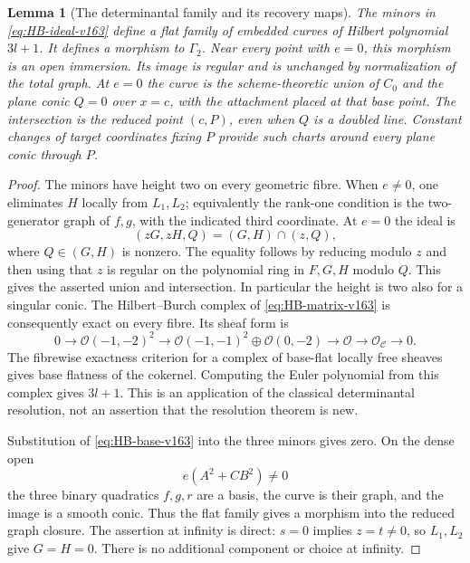\documentclass[11pt,reqno]{amsart}
\numberwithin{equation}{section}
\newtheorem{lemma}[theorem]{Lemma}
\theoremstyle{definition}\newtheorem{definition}[theorem]{Definition}
\theoremstyle{remark}\newtheorem{remark}[theorem]{Remark}
\newcommand{\OO}{\mathcal O}\newcommand{\II}{\mathcal I}
\begin{document}
\begin{lemma}[The determinantal family and its recovery maps]
\label{lem:HB-family-v163}
The minors in \eqref{eq:HB-ideal-v163} define a flat family of embedded
curves of Hilbert polynomial $3l+1$. It defines a morphism to $\Gamma_2$.
Near every point with $e=0$, this morphism is an open immersion. Its
image is regular and is unchanged by normalization of the total graph.
At $e=0$ the curve is the scheme-theoretic union of $C_0$ and the plane
conic $Q=0$ over $x=c$, with the attachment placed at that base
point. The intersection is the reduced point $(c,P)$, even when $Q$
is a doubled line. Constant changes of target coordinates fixing $P$
provide such charts around every plane conic through $P$.
\end{lemma}
\begin{proof}
The minors have height two on every geometric fibre. When $e\ne0$,
one eliminates $H$ locally from $L_1,L_2$; equivalently the rank-one
condition is the two-generator graph of $f,g$, with the indicated third
coordinate. At $e=0$ the ideal is
\[
 (zG,zH,Q)=(G,H)\cap(z,Q),
\]
where $Q\in(G,H)$ is nonzero. The equality follows by reducing modulo
$z$ and then using that $z$ is regular on the polynomial ring in
$F,G,H$ modulo $Q$. This gives the asserted union and intersection.
In particular the height is two also for a singular conic. The
Hilbert--Burch complex of \eqref{eq:HB-matrix-v163} is consequently
exact on every fibre. Its sheaf form is
\begin{equation}\label{eq:HB-resolution-v163}
 0\longrightarrow\OO(-1,-2)^2\longrightarrow
 \OO(-1,-1)^2\oplus\OO(0,-2)\longrightarrow
 \OO\longrightarrow\OO_{\mathcal C}\longrightarrow0.
\end{equation}
The fibrewise exactness criterion for a complex of base-flat locally
free sheaves gives base flatness of the cokernel. Computing the Euler
polynomial from this complex gives $3l+1$. This is an application of
the classical determinantal resolution, not an assertion that the
resolution theorem is new.

Substitution of \eqref{eq:HB-base-v163} into the three minors gives
zero. On the dense open
\[
             e(A^2+CB^2)\ne0
\]
the three binary quadratics $f,g,r$ are a basis, the curve is their
graph, and the image is a smooth conic. Thus the flat family gives a
morphism into the reduced graph closure. The assertion at infinity
is direct: $s=0$ implies $z=t\ne0$, so $L_1,L_2$ give $G=H=0$.
There is no additional component or choice at infinity.


\end{proof}
\end{document}
